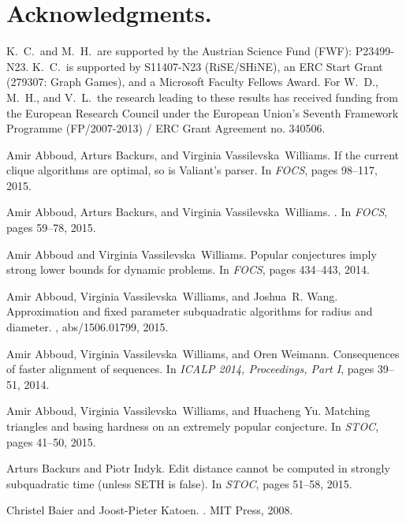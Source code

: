 \documentclass[11pt,letterpaper]{article}
\begin{document}
\section*{Acknowledgments.}
K.~C.\ and M.~H.\ are supported by the Austrian Science Fund (FWF): P23499-N23.
K.~C.\ is supported by S11407-N23 (RiSE/SHiNE), an ERC Start Grant (279307: Graph Games), and a Microsoft Faculty Fellows Award.
For W.~D., M.~H., and V.~L.\ the research leading to these results has received funding from the 
European Research Council under the European Union's Seventh Framework Programme 
(FP/2007-2013) / ERC Grant Agreement no. 340506.

\begin{thebibliography}{10}

Amir Abboud, Arturs Backurs, and Virginia Vassilevska~Williams.
\newblock If the current clique algorithms are optimal, so is {V}aliant's
  parser.
\newblock In {\em FOCS}, pages 98--117, 2015.

Amir Abboud, Arturs Backurs, and Virginia Vassilevska~Williams.
.
\newblock In {\em FOCS}, pages 59--78, 2015.

Amir Abboud and Virginia Vassilevska~Williams.
\newblock Popular conjectures imply strong lower bounds for dynamic problems.
\newblock In {\em {FOCS}}, pages 434--443, 2014.

Amir Abboud, Virginia Vassilevska~Williams, and Joshua~R. Wang.
\newblock Approximation and fixed parameter subquadratic algorithms for radius
  and diameter.
, abs/1506.01799, 2015.

Amir Abboud, Virginia Vassilevska~Williams, and Oren Weimann.
\newblock Consequences of faster alignment of sequences.
\newblock In {\em {ICALP} 2014, Proceedings, Part {I}}, pages 39--51, 2014.

Amir Abboud, Virginia Vassilevska~Williams, and Huacheng Yu.
\newblock Matching triangles and basing hardness on an extremely popular
  conjecture.
\newblock In {\em {STOC}}, pages 41--50, 2015.

Arturs Backurs and Piotr Indyk.
\newblock Edit distance cannot be computed in strongly subquadratic time
  (unless {SETH} is false).
\newblock In {\em {STOC}}, pages 51--58, 2015.

Christel Baier and Joost-Pieter Katoen.
.
\newblock MIT Press, 2008.


\end{thebibliography}
\end{document}
